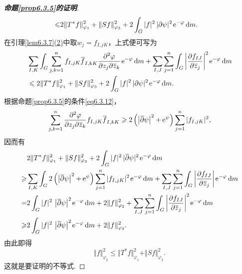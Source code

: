 \begin{proof}[\textbf{命题\ref{prop6.3.5}的证明}]
\begin{align*}
		\leqslant& 2\Vert T^\ast f\Vert_{\varphi_1}^2+\Vert Sf\Vert_{\varphi_3}^2+2\int_G |f|^2\,|\partial\psi|^2 \operatorname{\!\!\;\mathrm e}^{-\varphi}\mathop{}\!\mathrm{d} m.
	\end{align*}
	在引理\ref{lem6.3.7}\hyperlink{6.3.7}{(2)}中取$w_j=f_{I,jK}$，上式便可写为
	\begin{align}\label{eq6.3.16}
		&\sum_{I,K}\int_G\sum_{j,k=1}^{n}f_{I,jK}\bar{f}_{I,kK}\pppp{\varphi}{z_j}{\bar{z}_k}\ee^{-\varphi}\dif m+\sum_{I,J}\sum_{j=1}^{n}\int_G\left|\pp{f_{IJ}}{\bar{z}_j}\right|^2\ee^{-\varphi}\dif m\notag\\
		&\le 2\Vert T^\ast f\Vert_{\varphi_1}^2+\Vert Sf\Vert_{\varphi_3}^2+2\int_G |f|^2\,|\partial\psi|^2\ee^{-\varphi}\dif m.
	\end{align}
	根据命题\ref{prop6.3.5}的条件\eqref{eq6.3.12}，
	\[\sum_{j,k=1}^{n}\frac{\partial^2 \varphi}{\partial z_j\partial {}\mkern1mu\overline{\mkern-1muz}_k}f_{I,jK}{}\mkern1mu\overline{\mkern-1muf}_{I,kK}\geqslant2\left(\left|{}\mkern1mu\overline{\mkern-1mu\partial}\psi\right|^2+\operatorname{\!\!\;\mathrm e}^{\psi}\right)\sum_{j=1}^{n}|f_{I,jK}|^2,\]
	因而有
	\begin{align*}
		&2\Vert T^\ast f\Vert_{\varphi_1}^2+\Vert Sf\Vert_{\varphi_3}^2+2\int_G |f|^2\,|\bar{\partial}\psi|^2\ee^{-\varphi}\dif m\\
		\ge&\sum_{I,K}\int_G 2\left(\left|\bar{\partial}\psi\right|^2+\ee^{\psi}\right)\sum_{j=1}^{n}|f_{I,jK}|^2\ee^{-\varphi}\dif m+\sum_{I,J}\sum_{j=1}^{n}\int_G\left|\pp{f_{IJ}}{\bar{z}_j}\right|\ee^{-\varphi}\dif m\\
		=&2\int_G |f|^2\,\left|\bar{\partial}\psi\right|^2\ee^{-\varphi}\dif m+2\Vert f\Vert_{\varphi_2}^2+\sum_{I,J}\sum_{j=1}^{n}\int_G\left|\pp{f_{IJ}}{\bar{z}_j}\right|^2\ee^{-\varphi}\dif m\\
		\ge&2\int_G |f|^2\,\left|\bar{\partial}\psi\right|^2\ee^{-\varphi}\dif m+2\Vert f\Vert_{\varphi_2}^2.
	\end{align*}
	由此即得
	\[\Vert f\Vert_{\varphi_2}^2\le\Vert T^\ast f\Vert_{\varphi_1}^2+\Vert Sf\Vert_{\varphi_3}^2.\]
	这就是要证明的不等式.
\end{proof}
